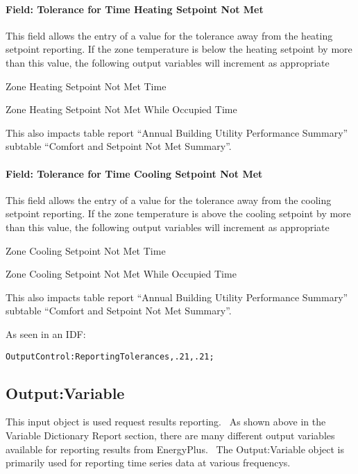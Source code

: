 \paragraph{Field: Tolerance for Time Heating Setpoint Not Met}\label{field-tolerance-for-time-heating-setpoint-not-met}

This field allows the entry of a value for the tolerance away from the heating setpoint reporting. If the zone temperature is below the heating setpoint by more than this value, the following output variables will increment as appropriate

Zone Heating Setpoint Not Met Time

Zone Heating Setpoint Not Met While Occupied Time

This also impacts table report ``Annual Building Utility Performance Summary'' subtable ``Comfort and Setpoint Not Met Summary''.

\paragraph{Field: Tolerance for Time Cooling Setpoint Not Met}\label{field-tolerance-for-time-cooling-setpoint-not-met}

This field allows the entry of a value for the tolerance away from the cooling setpoint reporting. If the zone temperature is above the cooling setpoint by more than this value, the following output variables will increment as appropriate

Zone Cooling Setpoint Not Met Time

Zone Cooling Setpoint Not Met While Occupied Time

This also impacts table report ``Annual Building Utility Performance Summary'' subtable ``Comfort and Setpoint Not Met Summary''.

As seen in an IDF:

\begin{lstlisting}
OutputControl:ReportingTolerances,.21,.21;
\end{lstlisting}

\subsection{Output:Variable}\label{outputvariable}

This input object is used request results reporting.~ As shown above in the Variable Dictionary Report section, there are many different output variables available for reporting results from EnergyPlus.~ The Output:Variable object is primarily used for reporting time series data at various frequencys.

